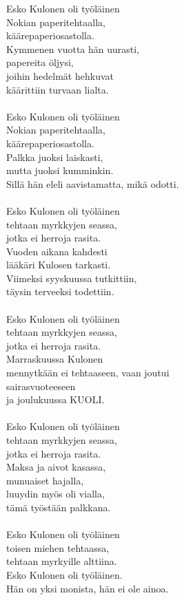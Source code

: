 
Esko Kulonen oli työläinen \\ Nokian paperitehtaalla, \\ käärepaperiosastolla. \\ Kymmenen vuotta hän uurasti, \\ papereita öljysi, \\ joihin hedelmät hehkuvat \\ käärittiin turvaan lialta. \\ \hspace{10mm} \\ Esko Kulonen oli työläinen \\ Nokian paperitehtaalla, \\ käärepaperiosastolla. \\ Palkka juoksi laiskasti, \\ mutta juoksi kumminkin. \\ Sillä hän eleli aavistamatta, mikä odotti. \\ \hspace{10mm} \\ Esko Kulonen oli työläinen \\ tehtaan myrkkyjen seassa, \\ jotka ei herroja rasita. \\ Vuoden aikana kahdesti \\ lääkäri Kulosen tarkasti. \\ Viimeksi syyskuussa tutkittiin, \\ täysin terveeksi todettiin. \\ \hspace{10mm} \\ Esko Kulonen oli työläinen \\ tehtaan myrkkyjen seassa, \\ jotka ei herroja rasita. \\ Marraskuussa Kulonen \\ mennytkään ei tehtaaseen, vaan joutui \\ sairasvuoteeseen \\ ja joulukuussa KUOLI. \\ \hspace{10mm} \\ Esko Kulonen oli työläinen \\ tehtaan myrkkyjen seassa, \\ jotka ei herroja rasita. \\ Maksa ja aivot kasassa, \\ munuaiset hajalla, \\ luuydin myös oli vialla, \\ tämä työstään palkkana. \\ \hspace{10mm} \\ Esko Kulonen oli työläinen \\ toisen miehen tehtaassa, \\ tehtaan myrkyille alttiina. \\ Esko Kulonen oli työläinen. \\ Hän on yksi monista, hän ei ole ainoa.